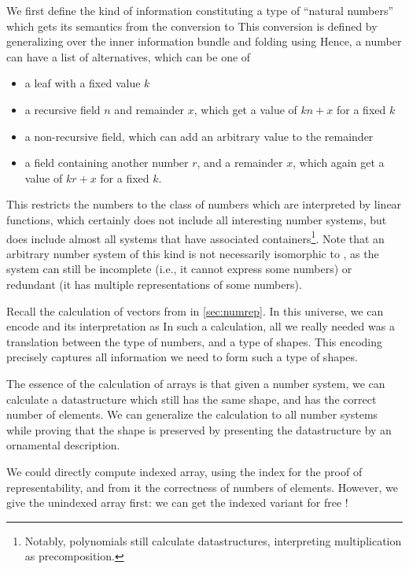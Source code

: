 We first define the kind of information constituting a type of ``natural numbers''
which gets its semantics from the conversion to \bN{}
This conversion is defined by generalizing over the inner information bundle and folding using
Hence, a number can have a list of alternatives, which can be one of
\begin{itemize}
    \item a leaf with a fixed value $k$
    \item a recursive field $n$ and remainder $x$, which get a value of $kn + x$ for a fixed $k$
    \item a non-recursive field, which can add an arbitrary value to the remainder
    \item a field containing another number $r$, and a remainder $x$, which again get a value of $kr + x$ for a fixed $k$.
\end{itemize}
This restricts the numbers to the class of numbers which are interpreted by linear functions, which certainly does not include all interesting number systems, but does include almost all systems that have associated containers\footnote{Notably, polynomials still calculate datastructures, interpreting multiplication as precomposition.}. Note that an arbitrary number system of this kind is not necessarily isomorphic to \bN{}, as the system can still be incomplete (i.e., it cannot express some numbers) or redundant (it has multiple representations of some numbers).

Recall the calculation of vectors from \bN{} in \autoref{sec:numrep}. In this universe, we can encode \bN{} and its interpretation as
In such a calculation, all we really needed was a translation between the type of numbers, and a type of shapes. This encoding precisely captures all information we need to form such a type of shapes.

The essence of the calculation of arrays is that given a number system, we can calculate a datastructure which still has the same shape, and has the correct number of elements. We can generalize the calculation to all number systems while proving that the shape is preserved by presenting the datastructure by an ornamental description.

We could directly compute indexed array, using the index for the proof of representability, and from it the correctness of numbers of elements. However, we give the unindexed array first: we can get the indexed variant for free \cite{algorn}!

